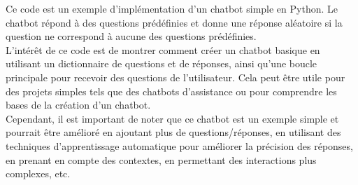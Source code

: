 \par Ce code est un exemple d'implémentation d'un chatbot simple en Python. Le chatbot répond à des questions prédéfinies et donne une réponse aléatoire si la question ne correspond à aucune des questions prédéfinies.\\

L'intérêt de ce code est de montrer comment créer un chatbot basique en utilisant un dictionnaire de questions et de réponses, ainsi qu'une boucle principale pour recevoir des questions de l'utilisateur. Cela peut être utile pour des projets simples tels que des chatbots d'assistance ou pour comprendre les bases de la création d'un chatbot.\\

Cependant, il est important de noter que ce chatbot est un exemple simple et pourrait être amélioré en ajoutant plus de questions/réponses, en utilisant des techniques d'apprentissage automatique pour améliorer la précision des réponses, en prenant en compte des contextes, en permettant des interactions plus complexes, etc.

